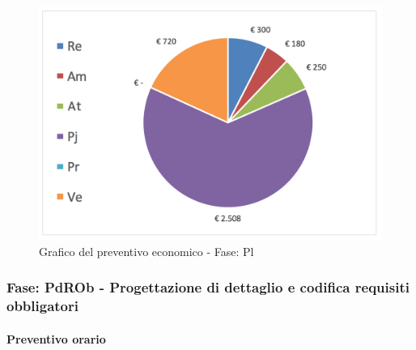 							\begin{figure}[H]  \centering  \includegraphics[scale=0.40]{img/s_Pl}
									\caption{Grafico del preventivo economico - Fase: 								Pl	}  \label{fig:s_Pl"} 		\end{figure}
		\newpage
		\subsubsection {Fase: PdROb - Progettazione di dettaglio e codifica requisiti obbligatori}
		\paragraph{Preventivo orario}

